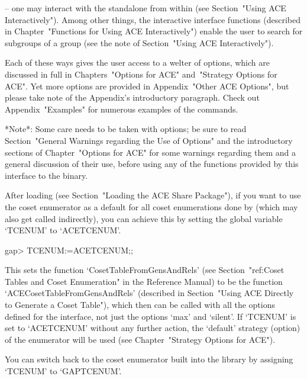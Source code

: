 \item{--} one may interact with  the  {\ACE}  standalone  from  within
{\GAP} (see Section~"Using ACE Interactively").  Among  other  things,
the   interactive   {\ACE}   interface   functions    (described    in
Chapter~"Functions for Using ACE Interactively") enable  the  user  to
search for subgroups of a group (see the note  of  Section~"Using  ACE
Interactively").

\endlist

Each of these ways gives the user access to a welter of options, which
are discussed in full  in  Chapters~"Options  for  ACE"  and~"Strategy
Options for ACE". Yet more options are provided in Appendix~"Other ACE
Options",  but  please  take  note  of  the  Appendix's   introductory
paragraph. Check out Appendix~"Examples" for numerous examples of  the
{\ACE} commands.

*Note*: Some care needs to be taken with  options;  be  sure  to  read
Section~"General Warnings  regarding  the  Use  of  Options"  and  the
introductory sections of Chapter~"Options for ACE" for  some  warnings
regarding them and a general discussion of their use, before using any
of the functions provided by this interface to the {\ACE} binary.


After loading  {\ACE}   (see Section~"Loading the ACE Share Package"),
if you  want to use the {\ACE}  coset enumerator as a  default for all
coset  enumerations  done  by   {\GAP}  (which  may  also  get  called
indirectly),  you can  achieve  this by  setting  the global  variable
`TCENUM' to `ACETCENUM'.

\beginexample
gap> TCENUM:=ACETCENUM;;
\endexample

This    sets    the    function    `CosetTableFromGensAndRels'    (see
Section~"ref:Coset  Tables  and  Coset  Enumeration"  in  the   {\GAP}
Reference Manual) to be  the  function  `ACECosetTableFromGensAndRels'
(described in Section~"Using ACE Directly to Generate a Coset Table"),
which then can be called with all the options defined for  the  {\ACE}
interface, not just the options `max' and `silent'. If `TCENUM' is set
to `ACETCENUM' without any  further  action,  the  `default'  strategy
(option) of the {\ACE} enumerator will be used (see  Chapter~"Strategy
Options for ACE").

You can switch back to the coset  enumerator  built  into  the  {\GAP}
library by assigning `TCENUM' to `GAPTCENUM'.

